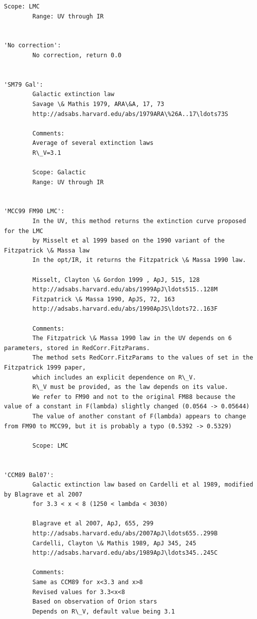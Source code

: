 \documentclass{report}
\begin{document}
\begin{Verbatim}[commandchars=\\\{\}]
        Scope: LMC
        Range: UV through IR

        
'No correction': 
        No correction, return 0.0
        
        
'SM79 Gal': 
        Galactic extinction law
        Savage \& Mathis 1979, ARA\&A, 17, 73
        http://adsabs.harvard.edu/abs/1979ARA\%26A..17\ldots73S
        
        Comments:
        Average of several extinction laws
        R\_V=3.1
        
        Scope: Galactic
        Range: UV through IR
        
        
'MCC99 FM90 LMC': 
        In the UV, this method returns the extinction curve proposed for the LMC 
        by Misselt et al 1999 based on the 1990 variant of the Fitzpatrick \& Massa law
        In the opt/IR, it returns the Fitzpatrick \& Massa 1990 law.

        Misselt, Clayton \& Gordon 1999 , ApJ, 515, 128 
        http://adsabs.harvard.edu/abs/1999ApJ\ldots515..128M
        Fitzpatrick \& Massa 1990, ApJS, 72, 163
        http://adsabs.harvard.edu/abs/1990ApJS\ldots72..163F
        
        Comments:
        The Fitzpatrick \& Massa 1990 law in the UV depends on 6 parameters, stored in RedCorr.FitzParams.
        The method sets RedCorr.FitzParams to the values of set in the Fitzpatrick 1999 paper, 
        which includes an explicit dependence on R\_V.
        R\_V must be provided, as the law depends on its value.
        We refer to FM90 and not to the original FM88 because the value of a constant in F(lambda) slightly changed (0.0564 -> 0.05644)
        The value of another constant of F(lambda) appears to change from FM90 to MCC99, but it is probably a typo (0.5392 -> 0.5329) 
        
        Scope: LMC

        
'CCM89 Bal07': 
        Galactic extinction law based on Cardelli et al 1989, modified by Blagrave et al 2007 
        for 3.3 < x < 8 (1250 < lambda < 3030)
        
        Blagrave et al 2007, ApJ, 655, 299 
        http://adsabs.harvard.edu/abs/2007ApJ\ldots655..299B
        Cardelli, Clayton \& Mathis 1989, ApJ 345, 245
        http://adsabs.harvard.edu/abs/1989ApJ\ldots345..245C

        Comments:
        Same as CCM89 for x<3.3 and x>8
        Revised values for 3.3<x<8
        Based on observation of Orion stars
        Depends on R\_V, default value being 3.1


\end{Verbatim}
\end{document}
